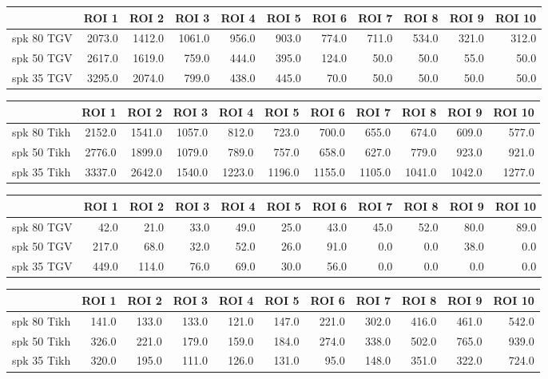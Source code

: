 \begin{tabular}{lrrrrrrrrrr}
\toprule
{} &   ROI 1 &   ROI 2 &   ROI 3 &  ROI 4 &  ROI 5 &  ROI 6 &  ROI 7 &  ROI 8 &  ROI 9 &  ROI 10 \\
\midrule
 spk 80 TGV &  2073.0 &  1412.0 &  1061.0 &  956.0 &  903.0 &  774.0 &  711.0 &  534.0 &  321.0 &   312.0 \\
 spk 50 TGV &  2617.0 &  1619.0 &   759.0 &  444.0 &  395.0 &  124.0 &   50.0 &   50.0 &   55.0 &    50.0 \\
 spk 35 TGV &  3295.0 &  2074.0 &   799.0 &  438.0 &  445.0 &   70.0 &   50.0 &   50.0 &   50.0 &    50.0 \\
\bottomrule
\end{tabular}
\begin{tabular}{lrrrrrrrrrr}
\toprule
{} &   ROI 1 &   ROI 2 &   ROI 3 &   ROI 4 &   ROI 5 &   ROI 6 &   ROI 7 &   ROI 8 &   ROI 9 &  ROI 10 \\
\midrule
 spk 80 Tikh &  2152.0 &  1541.0 &  1057.0 &   812.0 &   723.0 &   700.0 &   655.0 &   674.0 &   609.0 &   577.0 \\
 spk 50 Tikh &  2776.0 &  1899.0 &  1079.0 &   789.0 &   757.0 &   658.0 &   627.0 &   779.0 &   923.0 &   921.0 \\
 spk 35 Tikh &  3337.0 &  2642.0 &  1540.0 &  1223.0 &  1196.0 &  1155.0 &  1105.0 &  1041.0 &  1042.0 &  1277.0 \\
\bottomrule
\end{tabular}
\begin{tabular}{lrrrrrrrrrr}
\toprule
{} &  ROI 1 &  ROI 2 &  ROI 3 &  ROI 4 &  ROI 5 &  ROI 6 &  ROI 7 &  ROI 8 &  ROI 9 &  ROI 10 \\
\midrule
 spk 80 TGV &   42.0 &   21.0 &   33.0 &   49.0 &   25.0 &   43.0 &   45.0 &   52.0 &   80.0 &    89.0 \\
 spk 50 TGV &  217.0 &   68.0 &   32.0 &   52.0 &   26.0 &   91.0 &    0.0 &    0.0 &   38.0 &     0.0 \\
 spk 35 TGV &  449.0 &  114.0 &   76.0 &   69.0 &   30.0 &   56.0 &    0.0 &    0.0 &    0.0 &     0.0 \\
\bottomrule
\end{tabular}
\begin{tabular}{lrrrrrrrrrr}
\toprule
{} &  ROI 1 &  ROI 2 &  ROI 3 &  ROI 4 &  ROI 5 &  ROI 6 &  ROI 7 &  ROI 8 &  ROI 9 &  ROI 10 \\
\midrule
 spk 80 Tikh &  141.0 &  133.0 &  133.0 &  121.0 &  147.0 &  221.0 &  302.0 &  416.0 &  461.0 &   542.0 \\
 spk 50 Tikh &  326.0 &  221.0 &  179.0 &  159.0 &  184.0 &  274.0 &  338.0 &  502.0 &  765.0 &   939.0 \\
 spk 35 Tikh &  320.0 &  195.0 &  111.0 &  126.0 &  131.0 &   95.0 &  148.0 &  351.0 &  322.0 &   724.0 \\
\bottomrule
\end{tabular}
